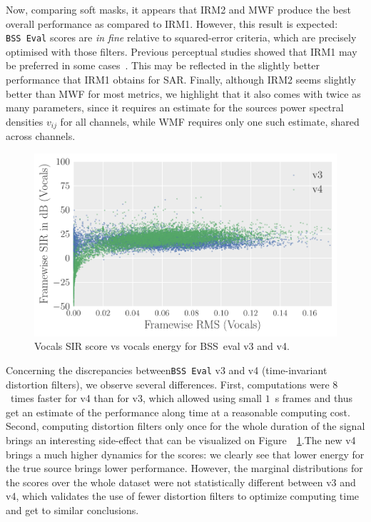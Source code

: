 \documentclass{llncs}
\begin{document}
Now, comparing soft masks, it appears that IRM2 and MWF produce the best overall performance as compared to IRM1. However, this result is expected: \texttt{BSS~Eval} scores are \textit{in fine} relative to squared-error criteria, which are precisely optimised with those filters. Previous perceptual studies showed that IRM1 may be preferred in some cases~\cite{liutkus15}. This may be reflected in the slightly better performance that IRM1 obtains for SAR. Finally, although IRM2 seems slightly better than MWF for most metrics, we highlight that it also comes with twice as many parameters, since it requires an estimate for the sources power spectral densities $v_{ij}$ for all channels, while WMF requires only one such estimate, shared across channels.


\begin{figure}[ht]
  \begin{center}
     \includegraphics[width=0.7\linewidth]{fig/evaluation_v3v4.pdf}
     \vspace{-1cm}
  \end{center}
  \caption{Vocals SIR score vs vocals energy for BSS~eval v3 and v4.  }
  \label{fig:v3v4}
\end{figure}

Concerning the discrepancies between\texttt{BSS~Eval} v3 and v4 (time-invariant distortion filters), we observe several differences. First, computations were $8$~times faster for v4 than for v3, which allowed using small $1$~s frames and thus get an estimate of the performance along time at a reasonable computing cost. Second, computing distortion filters only once for the whole duration of the signal brings an interesting side-effect that can be visualized on Figure~~\ref{fig:v3v4}.The new v4 brings a much higher dynamics for the scores: we clearly see that lower energy for the true source brings lower performance. However, the marginal distributions for the scores over the whole dataset were not statistically different between v3 and v4, which validates the use of fewer distortion filters to optimize computing time and get to similar conclusions.
\end{document}
